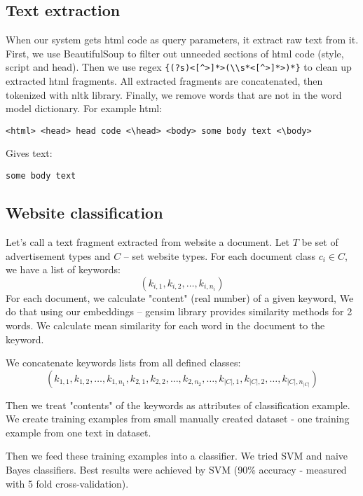 \documentclass[a4paper]{article}
\begin{document}
\subsection{Text extraction}
\label{extraction}
When our system gets html code as query parameters, it extract raw text from it.
First, we use BeautifulSoup to filter out unneeded sections of html code (style, script and head).
Then we use regex \verb|{(?s)<[^>]*>(\\s*<[^>]*>)*}| to clean up extracted html fragments.
All extracted fragments are concatenated, then tokenized with nltk library.
Finally, we remove words that are not in the word model dictionary.
For example html:
\begin{verbatim}
<html> <head> head code <\head> <body> some body text <\body>
\end{verbatim}
Gives text:
\begin{verbatim}
some body text
\end{verbatim}



\subsection{Website classification}
\label{classification}

Let's call a text fragment extracted from website a document.
Let $T$ be set of advertisement types and $C$ -- set website types.
For each document class $c_i\in{C}$, we have a list of keywords:
\begin{equation}
    (k_{i,1}, k_{i,2}, \ldots, k_{i, n_i})
\end{equation}
For each document, we calculate "content" (real number) of a given keyword,
We do that using our embeddings -- gensim library provides similarity methods for 2 words.
We calculate mean similarity for each word in the document to the keyword.

We concatenate keywords lists from all defined classes:
\begin{equation}
    (k_{1,1}, k_{1,2}, \ldots, k_{1, n_1},
    k_{2,1}, k_{2,2}, \ldots, k_{2, n_2},
    \ldots,
    k_{|C|,1}, k_{|C|,2}, \ldots, k_{|C|, n_{|C|}})
\end{equation}

Then we treat "contents" of the keywords as attributes of classification example.
We create training examples from small manually created dataset - one training example from one text in dataset.

Then we feed these training examples into a classifier.
We tried SVM and naive Bayes classifiers.
Best results were achieved by SVM (90\% accuracy - measured with 5 fold cross-validation).
\end{document}
